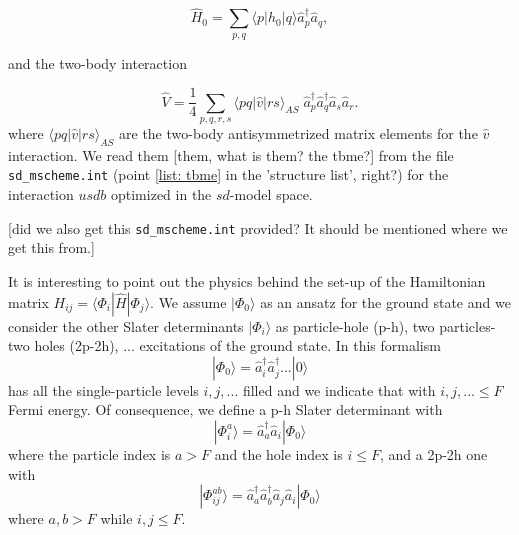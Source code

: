 \documentclass[twoside]{article}
\newcommand{\bra}[1]{\langle #1 |}
\newcommand{\ket}[1]{| #1 \rangle}
\begin{document}
\begin{equation}
\hat H_0 =  \sum_{p,q} \langle p \vert \hat h_0 \vert q \rangle \hat a_{p}^\dagger \hat a_{q},
\end{equation}

and the two-body interaction

\begin{equation}
\hat V = \frac{1}{4} \sum_{p,q,r,s} \langle p q\vert \hat v \vert rs \rangle_{AS} \;\hat a_{p}^\dagger \hat a_{q}^\dagger \hat a_{s} \hat a_{r}.
\end{equation}
where $\langle p q\vert \hat v \vert rs \rangle_{AS}$ are the two-body antisymmetrized matrix elements for the $\hat v$ interaction. We read them [them, what is them? the tbme?] from the file \texttt{sd\_mscheme.int} (point \ref{list: tbme} in the 'structure list', right?) for the interaction $usdb$ optimized in the $sd$-model space.

[did we also get this \texttt{sd\_mscheme.int} provided? It should be mentioned where we get this from.]


It is interesting to point out the physics behind the set-up of the Hamiltonian matrix $H_{ij}=\bra{\Phi_i} \hat H \ket{\Phi_j}$.
We assume $\ket{\Phi_0}$ as an ansatz for the ground state and we consider the other Slater determinants $\ket{\Phi_i}$ as particle-hole (p-h), two particles- two holes (2p-2h), ... excitations of the ground state.
In this formalism 
\begin{equation}
\ket{\Phi_0} = \hat a_{i}^\dagger \hat a_{j}^\dagger... \ket{0}
\end{equation}
has all the single-particle levels $i,j,...$ filled and we indicate that with $i,j,...\leq F$ Fermi energy.
Of consequence, we define a p-h Slater determinant with 
\begin{equation}
\ket{\Phi_i^a} = \hat a_{a}^\dagger \hat a_{i} \ket{\Phi_0}
\end{equation}
where the particle index is $a > F$ and the hole index is $i \leq F$, and a 2p-2h one with 
\begin{equation}
\ket{\Phi_{ij}^{ab}} = \hat a_{a}^\dagger \hat a_{b}^\dagger \hat a_{j} \hat a_{i} \ket{\Phi_0}
\end{equation}
where $a,b > F$ while $i,j \leq F$.
\end{document}
